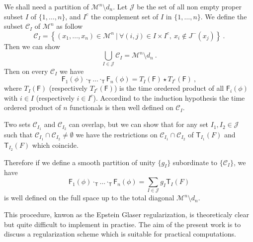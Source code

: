 \documentclass[11pt]{book}
\newcommand{\Ccal}{\mathcal{C}}
\newcommand{\Jcal}{\mathcal{J}}
\newcommand{\Mcal}{\mathcal{M}}
\newcommand{\Fsf}{\mathsf{F}}
\newcommand{\Tsf}{\mathsf{T}}
\theoremstyle{break}
\begin{document}

We shall need a partition of $\Mcal^n \setminus d_n$. Let $\Jcal$ be the set of all non empty proper subset $I$ of $\{1,\dots,n\}$, and $I^c$ the complement set of $I$ in $\{1,\dots,n\}$. We define the subset $\Ccal_I$ of $\Mcal^n$ as follow
%
\begin{equation*}
\Ccal_I = \left\{ (x_1,\dots,x_n) \in \Mcal^n \ | \ \forall (i,j) \in I \times I^c , \ x_i \notin J^-(x_j) \right\} \ .
\end{equation*}
%
Then we can show \cite{brunetti_microlocal_2000}
%
\begin{equation*}
\bigcup_{I \in \Jcal} \Ccal_I = \Mcal^n \setminus d_n \ .
\end{equation*}
%
Then on every $\Ccal_I$ we have 
%
\begin{equation*}
\Fsf_1(\phi) \cdot_\Tsf \dots \cdot_\Tsf \Fsf_n(\phi) = T_I(\Fsf) \star T_{I^c}(\Fsf) \ , 
\end{equation*}
%
where $T_I(\Fsf)$ (respectively $T_{I^c}(\Fsf)$) is the time oredered product of all $\Fsf_i(\phi)$ with $i \in I$ (respectively $i \in I^c$). Accordind to the induction hypothesis the time ordered product of $n$ functionals is then well defined on $\Ccal_I$. 




Two sets $\Ccal_{I_1}$ and $\Ccal_{I_2}$ can overlap, but we can show \cite{brunetti_microlocal_2000} that for any set $I_1 , I_2 \in \Jcal$ such that $\Ccal_{I_1} \cap \Ccal_{I_2} \neq \emptyset$ we have the restrictions on $\Ccal_{I_1} \cap \Ccal_{I_2}$ of $\Tsf_{I_1}(F)$ and $\Tsf_{I_2}(F)$ which coincide. 




Therefore if we define a smooth partition of unity $\{ g_I\}$  subordinate to $\{\Ccal_I\}$, we have
%
\begin{equation*}
\Fsf_1(\phi) \cdot_\Tsf \dots \cdot_\Tsf \Fsf_n(\phi) = \sum_{I\in\Jcal} g_I \Tsf_I(F) 
\end{equation*}
%
is well defined on the full space up to the total diagonal $\Mcal^n \setminus d_n$. 





This procedure, knwon as the Epstein Glaser regularization, is theoreticaly clear but quite difficult to implement in practise. The aim of the present work is to discuss a regularization scheme which is suitable for practical computations.

\bigskip
\end{document}
